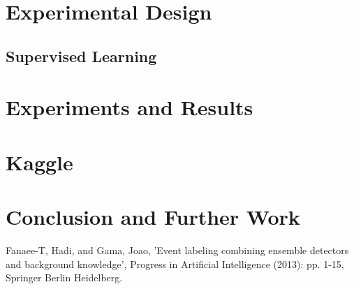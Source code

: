 \documentclass[12pt]{article}
\begin{document}
\section{Experimental Design}
\label{sec:experimental-design}



\subsection{Supervised Learning}
\label{supervised learning}


\section{Experiments and Results}
\label{sec:experiments-and-results}

\section{Kaggle}


\section{Conclusion and Further Work}
\label{sec:conclusion}



\begin{thebibliography}{9}
Fanaee-T, Hadi, and Gama, Joao, 'Event labeling combining ensemble detectors and background knowledge', Progress in Artificial Intelligence (2013): pp. 1-15, Springer Berlin Heidelberg.
\end{thebibliography}
\end{document}
